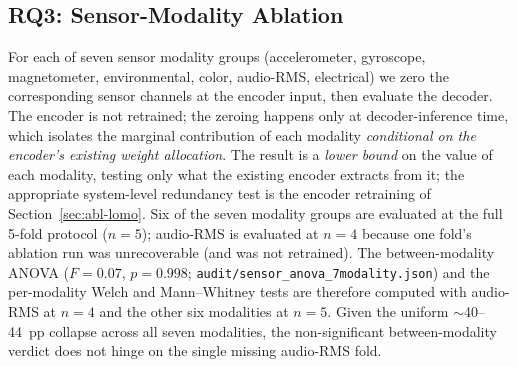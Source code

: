 \documentclass[sensors,article,submit,moreauthors,pdftex]{Definitions/mdpi}
\begin{document}
\subsection{RQ3: Sensor-Modality Ablation}
\label{sec:abl-sensors}

For each of seven sensor modality groups (accelerometer, gyroscope, magnetometer, environmental, color, audio-RMS, electrical) we zero the corresponding sensor channels at the encoder input, then evaluate the decoder. The encoder is not retrained; the zeroing happens only at decoder-inference time, which isolates the marginal contribution of each modality \emph{conditional on the encoder's existing weight allocation}. The result is a \emph{lower bound} on the value of each modality, testing only what the existing encoder extracts from it; the appropriate system-level redundancy test is the encoder retraining of Section~\ref{sec:abl-lomo}. Six of the seven modality groups are evaluated at the full 5-fold protocol ($n=5$); audio-RMS is evaluated at $n=4$ because one fold's ablation run was unrecoverable (and was not retrained). The between-modality ANOVA ($F\!=\!0.07$, $p\!=\!0.998$; \texttt{audit/sensor\_anova\_7modality.json}) and the per-modality Welch and Mann--Whitney tests are therefore computed with audio-RMS at $n=4$ and the other six modalities at $n=5$. Given the uniform $\sim$40--44~pp collapse across all seven modalities, the non-significant between-modality verdict does not hinge on the single missing audio-RMS fold.
\end{document}
